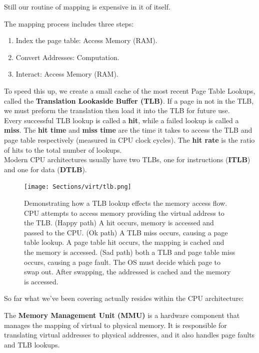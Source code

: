 \noindent
Still our routine of mapping is expensive in it of itself.
\begin{Def}

    The mapping process includes three steps:
    \begin{enumerate}
        \item Index the page table: Access Memory (RAM).
        \item Convert Addresses: Computation.
        \item Interact: Access Memory (RAM).
    \end{enumerate}
    \noindent
    To speed this up, we create a small cache of the most recent Page Table Lookups, called the \textbf{Translation Lookaside Buffer (TLB)}. If a 
    page in not in the TLB, we must preform the translation then load it into the TLB for future use.\\

    \noindent
    Every successful TLB lookup is called a \textbf{hit}, while a failed lookup is called a \textbf{miss}. The \textbf{hit time} and \textbf{miss time} are the time it takes to access the TLB and page table respectively (measured in CPU clock cycles).
    The \textbf{hit rate} is the ratio of hits to the total number of lookups.\\

    \noindent
    Modern CPU architectures usually have two TLBs, one for instructions (\textbf{ITLB}) and one for data (\textbf{DTLB}).
\end{Def}

\begin{figure}[h]
    \centering
    \texttt{[image: Sections/virt/tlb.png]}
    
    \vspace{1em}
    \caption{Demonstrating how a TLB lookup effects the memory access flow. CPU attempts to access memory providing 
    the virtual address to the TLB. (Happy path) A hit occurs, memory is accessed and passed to the CPU. (Ok path) A TLB miss occurs, causing a page table lookup. A page table hit occurs, the mapping is cached and the memory is accessed. (Sad path) both a TLB and page table miss occurs, causing a page fault. The OS must decide 
    which page to swap out. After swapping, the addressed is cached and the memory is accessed.}
    
    \label{fig:virt7}
\end{figure}

\newpage 
\noindent
So far what we've been covering actually resides within the CPU architecture:
\begin{Def}

    The \textbf{Memory Management Unit (MMU)} is a hardware component that manages the mapping of virtual to physical memory. It is responsible for translating virtual addresses to physical addresses, and it also handles page faults and TLB lookups.
\end{Def}

